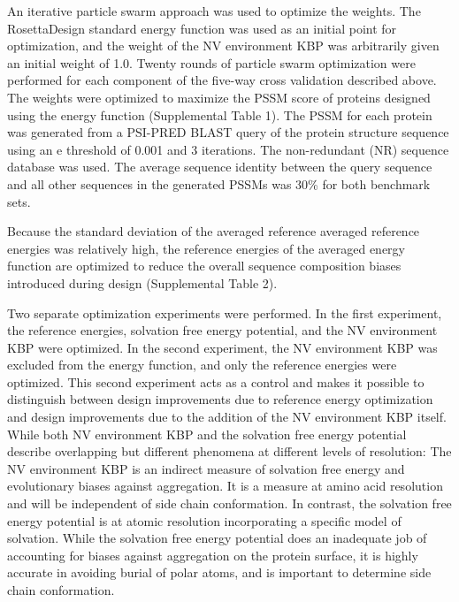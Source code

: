 An iterative particle swarm approach \citep{Chen:2007ua} was used to optimize the weights.
The RosettaDesign standard energy function was used as an initial point for optimization, and the weight of the NV environment KBP was arbitrarily given an initial weight of 1.0.
Twenty rounds of particle swarm optimization were performed for each component of the five-way cross validation described above.
The weights were optimized to maximize the PSSM score of proteins designed using the energy function (Supplemental Table 1).
The PSSM for each protein was generated from a PSI-PRED BLAST query of the protein structure sequence using an e threshold of 0.001 and 3 iterations.
The non-redundant (NR) sequence database was used.
The average sequence identity between the query sequence and all other sequences in the generated PSSMs was 30\% for both benchmark sets.

Because the standard deviation of the averaged reference averaged reference energies was relatively high, the reference energies of the averaged energy function are optimized to reduce the overall sequence composition biases introduced during design (Supplemental Table 2).

Two separate optimization experiments were performed.
In the first experiment, the reference energies, solvation free energy potential, and the NV environment KBP were optimized.
In the second experiment, the NV environment KBP was excluded from the energy function, and only the reference energies were optimized.
This second experiment acts as a control and makes it possible to distinguish between design improvements due to reference energy optimization and design improvements due to the addition of the NV environment KBP itself.
While both NV environment KBP and the solvation free energy potential describe overlapping but different phenomena at different levels of resolution: The NV environment KBP is an indirect measure of solvation free energy and evolutionary biases against aggregation.
It is a measure at amino acid resolution and will be independent of side chain conformation.
In contrast, the solvation free energy potential is at atomic resolution incorporating a specific model of solvation.
While the solvation free energy potential does an inadequate job of accounting for biases against aggregation on the protein surface, it is highly accurate in avoiding burial of polar atoms, and is important to determine side chain conformation.

